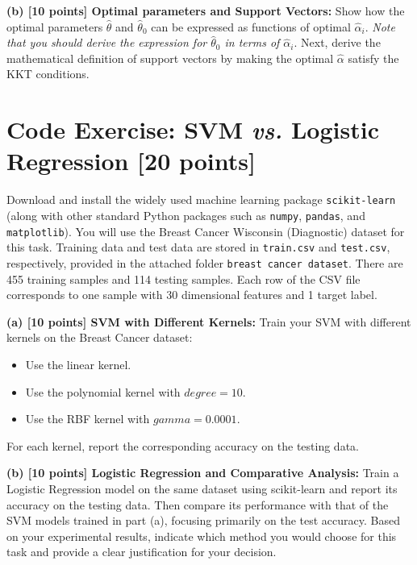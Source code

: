 \documentclass[11pt]{article}
\def\zn#1{{\color{blue}{\bf [ZN:} {\it{#1}}{\bf ]}}}
\begin{document}
\vspace{0.1in}
\noindent\textbf{(b) [10 points] Optimal parameters and Support Vectors:}
Show how the optimal parameters $\hat{\theta}$ and $\hat{\theta}_0$ can be expressed as functions of optimal $\hat{\alpha}_i$. \textit{Note that you should derive the expression for $\hat{\theta}_0$ in terms of $\hat{\alpha}_i$}. Next, derive the mathematical definition of support vectors by making the optimal $\hat{\alpha}$ satisfy the KKT conditions.

\section{Code Exercise: SVM \textit{vs.} Logistic Regression [20 points]}
Download and install the widely used machine learning package \texttt{scikit-learn} (along with other standard Python packages such as \texttt{numpy}, \texttt{pandas}, and \texttt{matplotlib}). You will use the Breast Cancer Wisconsin (Diagnostic) dataset for this task. Training data and test data are stored in \texttt{train.csv} and \texttt{test.csv}, respectively, provided in the attached folder \texttt{breast cancer dataset}. There are 455 training samples and 114 testing samples. Each row of the CSV file corresponds to one sample with 30 dimensional features and 1 target label.

\vspace{0.1in}
\noindent\textbf{(a) 
[10 points] SVM with Different Kernels:} 
Train your SVM with different kernels on the Breast Cancer dataset:
\begin{itemize}
	\item Use the linear kernel.
	\item Use the polynomial kernel with $degree=10$.
	\item Use the RBF kernel with $gamma=0.0001$.
\end{itemize}
For each kernel, report the corresponding accuracy on the testing data.

\vspace{0.1in}
\noindent\textbf{(b) [10 points] Logistic Regression and Comparative Analysis:} 
Train a Logistic Regression model on the same dataset using scikit-learn and report its accuracy on the testing data. Then compare its performance with that of the SVM models trained in part (a), focusing primarily on the test accuracy. Based on your experimental results, indicate which method you would choose for this task and provide a clear justification for your decision.
\end{document}
